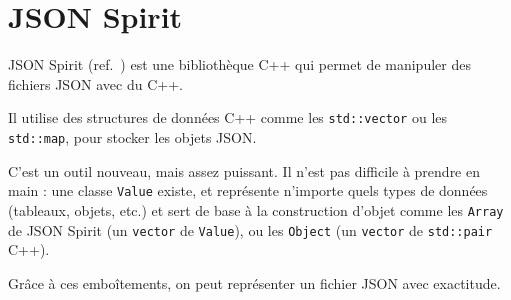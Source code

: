 \section{JSON Spirit}
JSON Spirit (ref.~\cite{JsonSpirit}) est une bibliothèque C++ qui permet de manipuler des fichiers JSON avec du C++.

Il utilise des structures de données C++ comme les \verb|std::vector| ou les \verb|std::map|, pour stocker les objets JSON. 

C'est un outil nouveau, mais assez puissant. Il n'est pas difficile à prendre en main : une classe \verb|Value| existe, et représente n'importe quels types de données (tableaux, objets, etc.) et sert de base à la construction d'objet comme les \verb|Array| de JSON Spirit (un \verb|vector| de \verb|Value|), ou les \verb|Object| (un \verb|vector| de \verb|std::pair| C++).

Grâce à ces emboîtements, on peut représenter un fichier JSON avec exactitude.
